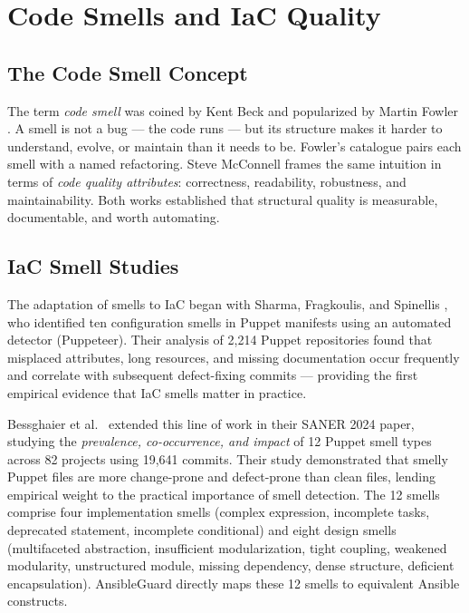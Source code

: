 \section{Code Smells and IaC Quality}
\label{sec:smells_bg}

\subsection{The Code Smell Concept}

The term \textit{code smell} was coined by Kent Beck and popularized by Martin
Fowler \cite{fowler1999refactoring}. A smell is not a bug — the code runs —
but its structure makes it harder to understand, evolve, or maintain than it
needs to be. Fowler's catalogue pairs each smell with a named refactoring.
Steve McConnell \cite{mcconnell2004codecomplete} frames the same intuition in
terms of \textit{code quality attributes}: correctness, readability, robustness,
and maintainability. Both works established that structural quality is
measurable, documentable, and worth automating.

\subsection{IaC Smell Studies}

The adaptation of smells to \ac{IaC} began with Sharma, Fragkoulis, and
Spinellis \cite{sharma2016puppet}, who identified ten configuration smells in
Puppet manifests using an automated detector (Puppeteer). Their analysis of
2,214 Puppet repositories found that misplaced attributes, long resources, and
missing documentation occur frequently and correlate with subsequent
defect-fixing commits — providing the first empirical evidence that \ac{IaC}
smells matter in practice.

\medskip\noindent
Bessghaier et al.\ \cite{bessghaier2024saner} extended this line of work in
their SANER 2024 paper, studying the \textit{prevalence, co-occurrence, and
impact} of 12 Puppet smell types across 82 projects using 19,641 commits. Their
study demonstrated that smelly Puppet files are more change-prone and
defect-prone than clean files, lending empirical weight to the practical importance
of smell detection. The 12 smells comprise four implementation smells (complex
expression, incomplete tasks, deprecated statement, incomplete conditional) and
eight design smells (multifaceted abstraction, insufficient modularization,
tight coupling, weakened modularity, unstructured module, missing dependency,
dense structure, deficient encapsulation). AnsibleGuard directly maps these
12 smells to equivalent Ansible constructs.

